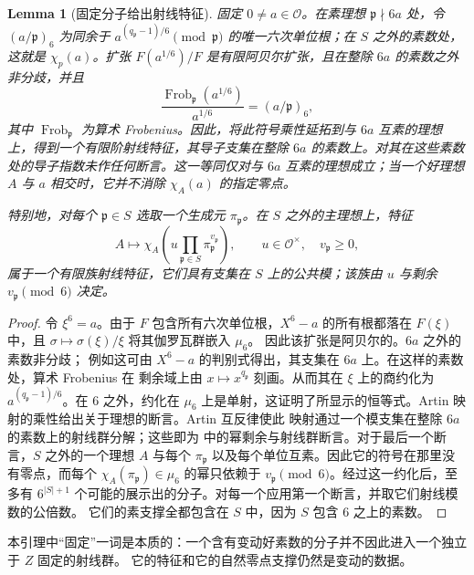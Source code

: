 \documentclass[11pt,a4paper]{article}
\numberwithin{equation}{section}
\numberwithin{figure}{section}
\newtheorem{lemma}[theorem]{Lemma}
\theoremstyle{definition}
\theoremstyle{remark}
\begin{document}
\begin{lemma}[固定分子给出射线特征]
\label{lem:fixed-numerator-ray}
固定 $0\ne a\in\mathcal O$。在素理想 $\mathfrak p\nmid6a$ 处，令
$(a/\mathfrak p)_6$ 为同余于
$a^{(q_{\mathfrak p}-1)/6}\pmod{\mathfrak p}$ 的唯一六次单位根；在 $S$ 之外的素数处，这就是
$\chi_p(a)$。扩张 $F(a^{1/6})/F$ 是有限阿贝尔扩张，且在整除 $6a$ 的素数之外非分歧，并且
\[
 \frac{\operatorname{Frob}_{\mathfrak p}(a^{1/6})}{a^{1/6}}
       =(a/\mathfrak p)_6,
\]
其中 $\operatorname{Frob}_{\mathfrak p}$ 为算术 Frobenius。因此，将此符号乘性延拓到与 $6a$ 互素的理想上，得到一个有限阶射线特征，其导子支集在整除 $6a$ 的素数上。对其在这些素数处的导子指数未作任何断言。这一等同仅对与 $6a$ 互素的理想成立；当一个好理想 $A$ 与 $a$ 相交时，它并不消除 $\chi_A(a)$ 的指定零点。

特别地，对每个
$\mathfrak p\in S$ 选取一个生成元 $\pi_{\mathfrak p}$。在 $S$ 之外的主理想上，特征
\[
 A\longmapsto\chi_A\left(u\prod_{\mathfrak p\in S}
                       \pi_{\mathfrak p}^{v_{\mathfrak p}}\right),
 \qquad u\in\mathcal O^\times,\quad v_{\mathfrak p}\ge0,
\]
属于一个有限族射线特征，它们具有支集在 $S$ 上的公共模；该族由 $u$ 与剩余
$v_{\mathfrak p}\pmod6$ 决定。
\end{lemma}

\begin{proof}
令 $\xi^6=a$。由于 $F$ 包含所有六次单位根，$X^6-a$ 的所有根都落在 $F(\xi)$ 中，且
$\sigma\mapsto\sigma(\xi)/\xi$ 将其伽罗瓦群嵌入 $\mu_6$。
因此该扩张是阿贝尔的。$6a$ 之外的素数非分歧；
例如这可由 $X^6-a$ 的判别式得出，其支集在 $6a$ 上。在这样的素数处，算术 Frobenius 在
剩余域上由 $x\mapsto x^{q_{\mathfrak p}}$ 刻画。从而其在 $\xi$ 上的商约化为 $a^{(q_{\mathfrak p}-1)/6}$。在 $6$ 之外，约化在
$\mu_6$ 上是单射，这证明了所显示的恒等式。Artin 映射的乘性给出关于理想的断言。Artin 互反律使此
映射通过一个模支集在整除 $6a$ 的素数上的射线群分解；这些即为
\cite[Chapter VIII, (5.3) and (5.5)]{MilneCFT} 中的幂剩余与射线群断言。对于最后一个断言，$S$ 之外的一个理想 $A$ 与每个
$\pi_{\mathfrak p}$ 以及每个单位互素。因此它的符号在那里没有零点，而每个
$\chi_A(\pi_{\mathfrak p})\in\mu_6$ 的幂只依赖于 $v_{\mathfrak p}\pmod6$。经过这一约化后，至多有
$6^{|S|+1}$ 个可能的展示出的分子。对每一个应用第一个断言，并取它们射线模数的公倍数。
它们的素支撑全都包含在 $S$ 中，因为 $S$ 包含 $6$ 之上的素数。
\end{proof}

本引理中“固定”一词是本质的：一个含有变动好素数的分子并不因此进入一个独立于 $Z$ 固定的射线群。
它的特征和它的自然零点支撑仍然是变动的数据。
\end{document}
